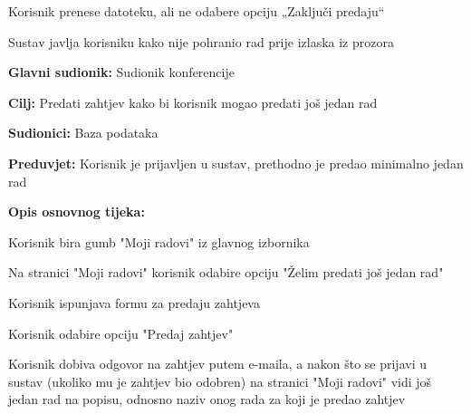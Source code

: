 \begin{packed_item}
\begin{packed_item}
							\item[3.b]  Korisnik prenese datoteku, ali ne odabere opciju „Zaključi predaju“
							\item[] \begin{packed_enum}
								
								\item Sustav javlja korisniku kako nije pohranio rad prije izlaska iz prozora
								
							\end{packed_enum}
							
						\end{packed_item}
			
					\end{packed_item}

					\noindent {}
					\begin{packed_item}
	
						\item \textbf{Glavni sudionik: } Sudionik konferencije
						\item  \textbf{Cilj:} Predati zahtjev kako bi korisnik mogao predati još jedan rad
						\item  \textbf{Sudionici:} Baza podataka
						\item  \textbf{Preduvjet:} Korisnik je prijavljen u sustav, prethodno je predao minimalno jedan rad
						\item  \textbf{Opis osnovnog tijeka:}
						
						\item[] \begin{packed_enum}
							\item Korisnik bira gumb "Moji radovi" iz glavnog izbornika
							\item Na stranici "Moji radovi" korisnik odabire opciju "Želim predati još jedan rad"
							\item Korisnik ispunjava formu za predaju zahtjeva
							\item Korisnik odabire opciju "Predaj zahtjev"
							\item Korisnik dobiva odgovor na zahtjev putem e-maila, a nakon što se prijavi u sustav (ukoliko mu je zahtjev bio odobren) na stranici "Moji radovi" vidi još jedan rad na popisu, odnosno naziv onog rada za koji je predao zahtjev

					
						\end{packed_enum}
			
					\end{packed_item}

